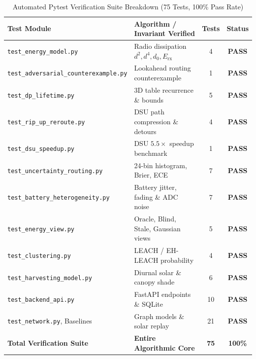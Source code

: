 \documentclass[journal]{IEEEtran}
\begin{document}
\begin{table}[!t]
\caption{Automated Pytest Verification Suite Breakdown (75 Tests, 100\% Pass Rate)}
\label{tab:test_suite}
\centering
\begin{tabular}{@{}llcc@{}}
\toprule
\textbf{Test Module} & \textbf{Algorithm / Invariant Verified} & \textbf{Tests} & \textbf{Status} \\
\midrule
\texttt{test\_energy\_model.py} & Radio dissipation $d^2, d^4, d_0, E_{\text{rx}}$ & 4 & \textbf{PASS} \\
\texttt{test\_adversarial\_counterexample.py} & Lookahead routing counterexample & 1 & \textbf{PASS} \\
\texttt{test\_dp\_lifetime.py} & 3D table recurrence \& bounds & 5 & \textbf{PASS} \\
\texttt{test\_rip\_up\_reroute.py} & DSU path compression \& detours & 4 & \textbf{PASS} \\
\texttt{test\_dsu\_speedup.py} & DSU $5.5\times$ speedup benchmark & 1 & \textbf{PASS} \\
\texttt{test\_uncertainty\_routing.py} & 24-bin histogram, Brier, ECE & 7 & \textbf{PASS} \\
\texttt{test\_battery\_heterogeneity.py} & Battery jitter, fading \& ADC noise & 7 & \textbf{PASS} \\
\texttt{test\_energy\_view.py} & Oracle, Blind, Stale, Gaussian views & 5 & \textbf{PASS} \\
\texttt{test\_clustering.py} & LEACH / EH-LEACH probability & 4 & \textbf{PASS} \\
\texttt{test\_harvesting\_model.py} & Diurnal solar \& canopy shade & 6 & \textbf{PASS} \\
\texttt{test\_backend\_api.py} & FastAPI endpoints \& SQLite & 10 & \textbf{PASS} \\
\texttt{test\_network.py}, Baselines & Graph models \& solar replay & 21 & \textbf{PASS} \\
\midrule
\textbf{Total Verification Suite} & \textbf{Entire Algorithmic Core} & \textbf{75} & \textbf{100\%} \\
\bottomrule
\end{tabular}
\end{table}
\end{document}
